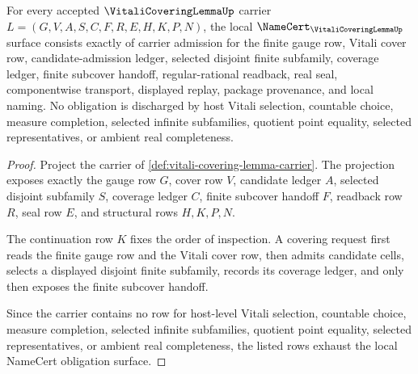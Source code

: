 \begin{theorem}
\label{thm:vitali-covering-lemma-namecert-obligations}
For every accepted $\VitaliCoveringLemmaUp$ carrier $L=(G,V,A,S,C,F,R,E,H,K,P,N)$, the local $\NameCert_{\VitaliCoveringLemmaUp}$ surface consists exactly of carrier admission for the finite gauge row, Vitali cover row, candidate-admission ledger, selected disjoint finite subfamily, coverage ledger, finite subcover handoff, regular-rational readback, real seal, componentwise transport, displayed replay, package provenance, and local naming. No obligation is discharged by host Vitali selection, countable choice, measure completion, selected infinite subfamilies, quotient point equality, selected representatives, or ambient real completeness.
\end{theorem}
\begin{proof}
Project the carrier of \autoref{def:vitali-covering-lemma-carrier}. The projection exposes exactly the gauge row $G$, cover row $V$, candidate ledger $A$, selected disjoint subfamily $S$, coverage ledger $C$, finite subcover handoff $F$, readback row $R$, seal row $E$, and structural rows $H,K,P,N$.

The continuation row $K$ fixes the order of inspection. A covering request first reads the finite gauge row and the Vitali cover row, then admits candidate cells, selects a displayed disjoint finite subfamily, records its coverage ledger, and only then exposes the finite subcover handoff.

Since the carrier contains no row for host-level Vitali selection, countable choice, measure completion, selected infinite subfamilies, quotient point equality, selected representatives, or ambient real completeness, the listed rows exhaust the local NameCert obligation surface.
\end{proof}

